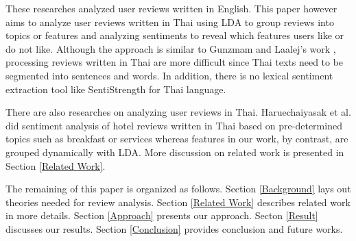 These researches analyzed user reviews written in English. This paper however aims to analyze user reviews written in Thai using LDA to group reviews into topics or features and analyzing sentiments to reveal which features users like or do not like. Although the approach is similar to Gunzmam and Laalej's work \cite{userslikefeature}, processing reviews written in Thai are more difficult since Thai texts need to be segmented into sentences and words. In addition, there is no  lexical sentiment extraction tool like SentiStrength for Thai language. 

There are also researches on analyzing user reviews in Thai. Haruechaiyasak et al. \cite{thaiopinionmininghotel} did sentiment analysis of hotel reviews written in Thai based on pre-determined topics such as breakfast or services whereas features in our work, by contrast, are grouped dynamically with LDA. More discussion on related work is presented in Section \ref{Related Work}.

The remaining of this paper is organized as follows. Section \ref{Background} lays out theories needed for review analysis. Section \ref{Related Work} describes related work in more details. Section \ref{Approach} presents our approach. Secton \ref{Result} discusses our results. Section \ref{Conclusion} provides conclusion and future works. 

